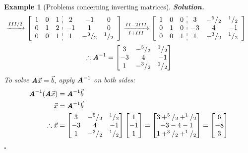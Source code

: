\documentclass[12pt, a4paper]{article}
\newtheorem{eg}{Example}[subsection]
\newenvironment*{sol}{\indent\textbf{Solution. }}{\hfill{$\square$}\par}
\def\vecx{\vec{x}}
\def\vecb{\vec{b}}
\def\matrixA{\textbf{\emph{A}}}
\begin{document}
\begin{eg}[Problems concerning inverting matrices]
\begin{sol}
$$\begin{aligned}
			&\xrightarrow[]{III/2}\left[\begin{array}{c:c}\begin{matrix}1&0&1\\0&1&2\\0&0&1\end{matrix}&\begin{matrix}2&-1&0\\-1&1&0\\1&-^3/_2&^1/_2\end{matrix}\end{array}\right]\xrightarrow[I+III]{II-2III}\left[\begin{array}{c:c}\begin{matrix}1&0&0\\0&1&0\\0&0&1\end{matrix}&\begin{matrix}3&-^5/_2&^1/_2\\-3&4&-1\\1&-^3/_2&^1/_2\end{matrix}\end{array}\right]
		\end{aligned}$$
		\[\therefore\matrixA^{-1}=\begin{bmatrix}3&-^5/_2&^1/_2\\-3&4&-1\\1&-^3/_2&^1/_2\end{bmatrix}\]
		To solve $\matrixA\vecx=\vecb,$ apply $\matrixA^{-1}$ on both sides: 
		$$\begin{aligned}
		\matrixA^{-1}(\matrixA\vecx)&=\matrixA^{-1}\vecb\\
		\vecx&=\matrixA^{-1}\vecb\\
		\therefore\vecx&=\begin{bmatrix}3&-^5/_2&^1/_2\\-3&4&-1\\1&-^3/_2&^1/_2\end{bmatrix}\begin{bmatrix}1\\-1\\1\end{bmatrix}=\begin{bmatrix}3+^5/_2+^1/_2\\-3-4-1\\1+^3/_2+^1/_2\end{bmatrix}=\begin{bmatrix}6\\-8\\3\end{bmatrix}
		\end{aligned}$$
	\end{sol}
\end{eg}
\end{document}
